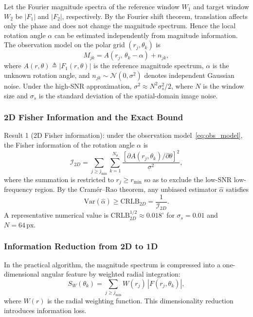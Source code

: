\documentclass[lettersize,journal]{IEEEtran}
\newcommand{\CRLB}{\mathrm{CRLB}}
\newcommand{\Var}{\mathrm{Var}}
\begin{document}
Let the Fourier magnitude spectra of the reference window $W_1$ and target window $W_2$ be
$|F_1|$ and $|F_2|$, respectively.
By the Fourier shift theorem, translation affects only the phase and does not change the magnitude spectrum.
Hence the local rotation angle $\alpha$ can be estimated independently from magnitude information.
The observation model on the polar grid $(r_j,\theta_k)$ is
%
\begin{equation}
  M_{jk} = A(r_j,\, \theta_k - \alpha) + n_{jk},
  \label{eq:obs_model}
\end{equation}
%
where $A(r,\theta) \triangleq |F_1(r,\theta)|$ is the reference magnitude spectrum,
$\alpha$ is the unknown rotation angle,
and $n_{jk} \sim \mathcal{N}(0,\sigma^2)$ denotes independent Gaussian noise.
Under the high-SNR approximation, $\sigma^2 \approx N^2 \sigma_s^2 / 2$,
where $N$ is the window size and $\sigma_s$ is the standard deviation of the spatial-domain image noise.

\subsubsection{2D Fisher Information and the Exact Bound}

Result 1 (2D Fisher information):
under the observation model~\eqref{eq:obs_model}, the Fisher information of the rotation angle $\alpha$ is
%
\begin{equation}
  \mathcal{I}_{2D}
  = \sum_{j \geq j_{\min}} \sum_{k=1}^{N_\theta}
    \frac{[\partial A(r_j, \theta_k)/\partial\theta]^2}{\sigma^2},
  \label{eq:fisher_2d}
\end{equation}
%
where the summation is restricted to $r_j \geq r_{\min}$ so as to exclude the low-SNR low-frequency region.
By the Cram\'{e}r--Rao theorem, any unbiased estimator $\hat{\alpha}$ satisfies
%
\begin{equation}
  \Var(\hat{\alpha}) \geq \CRLB_{2D}
  = \frac{1}{\mathcal{I}_{2D}}.
  \label{eq:crlb_2d}
\end{equation}
%
A representative numerical value is $\CRLB_{2D}^{1/2} \approx 0.018^\circ$
for $\sigma_s = 0.01$ and $N=64\,\mathrm{px}$.

\subsubsection{Information Reduction from 2D to 1D}

In the practical algorithm, the magnitude spectrum is compressed into a one-dimensional angular feature by weighted radial integration:
%
\begin{equation}
  S_W(\theta_k) = \sum_{j \geq j_{\min}} W(r_j)\,|F(r_j, \theta_k)|,
  \label{eq:radial_int}
\end{equation}
%
where $W(r)$ is the radial weighting function.
This dimensionality reduction introduces information loss.
\end{document}
